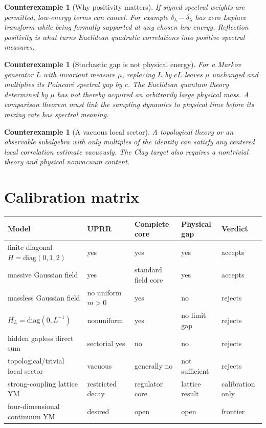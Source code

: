 \documentclass[11pt]{article}
\newtheorem{counterexample}[definition]{Counterexample}
\theoremstyle{remark}
\begin{document}
\begin{counterexample}[Why positivity matters]
If signed spectral weights are permitted, low-energy terms can cancel.  For
example $\delta_{\lambda}-\delta_{\lambda}$ has zero Laplace transform while
being formally supported at any chosen low energy.  Reflection positivity is
what turns Euclidean quadratic correlations into positive spectral measures.
\end{counterexample}

\begin{counterexample}[Stochastic gap is not physical energy]
For a Markov generator $L$ with invariant measure $\mu$, replacing $L$ by
$cL$ leaves $\mu$ unchanged and multiplies its Poincar\'e spectral gap by $c$.
The Euclidean quantum theory determined by $\mu$ has not thereby acquired an
arbitrarily large physical mass.  A comparison theorem must link the sampling
dynamics to physical time before its mixing rate has spectral meaning.
\end{counterexample}

\begin{counterexample}[A vacuous local sector]
A topological theory or an observable subalgebra with only multiples of the
identity can satisfy any centered local correlation estimate vacuously.  The
Clay target also requires a nontrivial theory and physical nonvacuum content.
\end{counterexample}

\section{Calibration matrix}

\begin{center}
\small
\begin{tabular}{p{}p{}p{}p{}p{}}
\toprule
Model & UPRR & Complete core & Physical gap & Verdict\\
\midrule
finite diagonal $H=\mathrm{diag}(0,1,2)$ & yes & yes & yes & accepts\\
massive Gaussian field & yes & standard field core & yes & accepts\\
massless Gaussian field & no uniform $m>0$ & yes & no & rejects\\
$H_L=\mathrm{diag}(0,L^{-1})$ & nonuniform & yes & no limit gap & rejects\\
hidden gapless direct sum & sectorial yes & no & no & rejects\\
topological/trivial local sector & vacuous & generally no & not sufficient & rejects\\
strong-coupling lattice YM & restricted decay & regulator core & lattice result & calibration only\\
four-dimensional continuum YM & desired & open & open & frontier\\
\bottomrule
\end{tabular}
\end{center}
\end{document}
